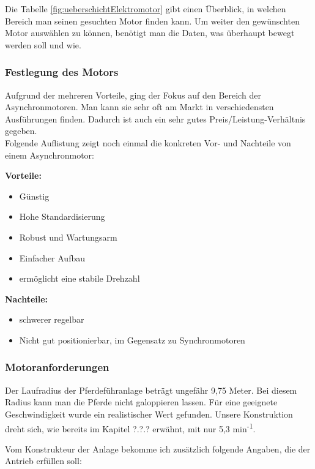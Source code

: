 Die Tabelle \ref{fig:ueberschichtElektromotor} gibt einen Überblick, in welchen Bereich man seinen gesuchten Motor finden kann. 
Um weiter den gewünschten Motor auswählen zu können, benötigt man die Daten, was überhaupt bewegt werden soll und wie. 

\subsubsection{Festlegung des Motors}
\label{sec:festlegungDesMotors}

Aufgrund der mehreren Vorteile, ging der Fokus auf den Bereich der Asynchronmotoren. Man kann sie sehr oft am Markt in verschiedensten Ausführungen finden. Dadurch ist auch ein sehr gutes Preis/Leistung-Verhältnis gegeben. 
\\
Folgende Auflistung zeigt noch einmal die konkreten Vor- und Nachteile von einem Asynchronmotor:


\textbf{Vorteile:}

\begin{itemize}
	\item{Günstig}
	\item{Hohe Standardisierung}
	\item{Robust und Wartungsarm}
	\item{Einfacher Aufbau}
	\item{ermöglicht eine stabile Drehzahl}
\end{itemize}

\textbf{Nachteile:}

\begin{itemize}
	\item{schwerer regelbar}
	\item{Nicht gut positionierbar, im Gegensatz zu Synchronmotoren}
\end{itemize}

\subsubsection{Motoranforderungen}
\label{sec:motoranforderungen}

Der Laufradius der Pferdeführanlage beträgt ungefähr 9,75 Meter. Bei diesem Radius kann man die Pferde nicht galoppieren lassen. 
Für eine geeignete Geschwindigkeit wurde ein realistischer Wert gefunden. %
Unsere Konstruktion dreht sich, wie bereits im Kapitel ?.?.? erwähnt, mit nur 5,3 min\textsuperscript{-1}. 

Vom Konstrukteur der Anlage bekomme ich zusätzlich folgende Angaben, die der Antrieb erfüllen soll:
\\

